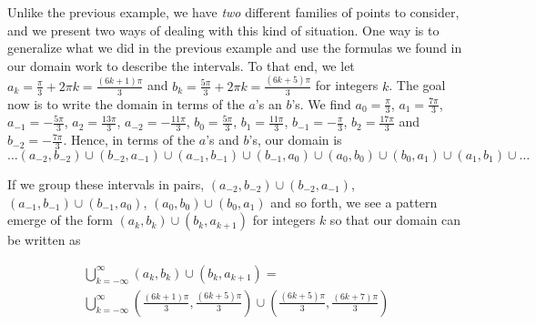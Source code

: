 {\begin{enumerate}
\begin{center}
\end{center}

\drawexampleline

Unlike the previous example, we have \textit{two} different families of points to consider, and we present two ways of dealing with this kind of situation.  One way is to generalize what we did in the previous example and use the formulas we found in our domain work to describe the intervals.  To that end, we let  $a_{k} = \frac{\pi}{3} + 2\pi k = \frac{(6k+1)\pi}{3}$ and  $b_{k} = \frac{5\pi}{3} + 2\pi k = \frac{(6k+5) \pi}{3}$ for integers $k$.  The goal now is to write the domain in terms of the $a$'s an $b$'s.  We find $a_{0} =  \frac{\pi}{3}$, $a_{1} =  \frac{7\pi}{3}$,  $a_{-1} =  -\frac{5\pi}{3}$, $a_{2} =  \frac{13\pi}{3}$, $a_{-2} =  -\frac{11\pi}{3}$, $b_{0} =  \frac{5\pi}{3}$,  $b_{1} =  \frac{11\pi}{3}$, $b_{-1} =  -\frac{\pi}{3}$,  $b_{2} =  \frac{17\pi}{3}$  and $b_{-2} =  -\frac{7\pi}{3}$.  Hence, in terms of the $a$'s and $b$'s, our domain is
\[
 \ldots  \left(a_{-2}, b_{-2}  \right) \cup \left(b_{-2}, a_{-1}  \right)\cup \left(a_{-1}, b_{-1}  \right)\cup \left(b_{-1}, a_{0}  \right)\cup \left(a_{0}, b_{0}  \right)\cup \left(b_{0}, a_{1}  \right)\cup \left(a_{1}, b_{1}  \right)\cup \dots 
\]

If we group these intervals in pairs, $ \left(a_{-2}, b_{-2}  \right) \cup \left(b_{-2}, a_{-1}  \right)$, $\left(a_{-1}, b_{-1}  \right)\cup \left(b_{-1}, a_{0}  \right)$, $\left(a_{0}, b_{0}  \right)\cup \left(b_{0}, a_{1}  \right)$ and so forth, we see a pattern emerge of the form  $\left(a_{k}, b_{k}  \right)\cup \left(b_{k}, a_{k+1}  \right)$ for integers $k$ so that our domain can be written as 

\begin{multline*}
 \bigcup_{k = -\infty}^{\infty} \left(a_{k}, b_{k}  \right)\cup \left(b_{k}, a_{k+1}  \right) = \\ \bigcup_{k = -\infty}^{\infty} \left(\frac{(6k+1)\pi}{3}, \frac{(6k+5) \pi}{3}  \right)\cup \left(\frac{(6k+5) \pi}{3}, \frac{(6k+7)\pi}{3}  \right)
\end{multline*}


\end{enumerate}}

